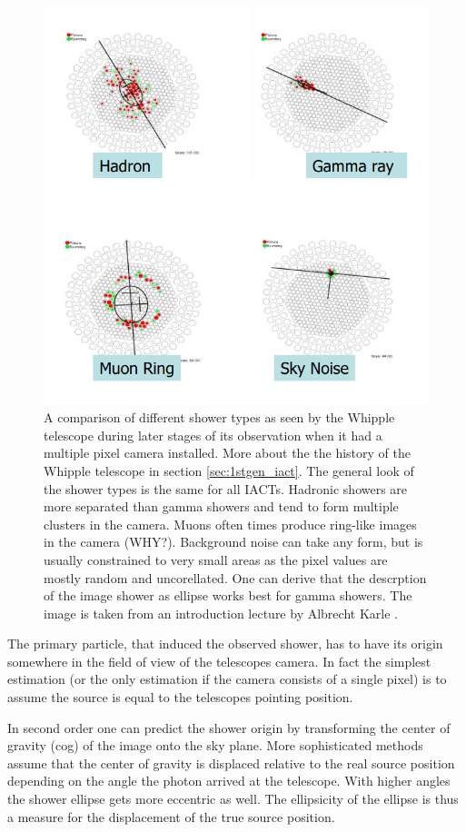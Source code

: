 \begin{figure}
	\centering
	\includegraphics[width=.8\textwidth]{images/shower_types.png}
	\caption{A comparison of different shower types as seen 
	by the Whipple telescope during later stages of its observation
	when it had a multiple pixel camera installed.
	More about the the history of the Whipple telescope in section
	\ref{sec:1stgen_iact}. The general look of the shower types 
	is the same for all IACTs.
	Hadronic showers are more separated than gamma showers and tend to
	form multiple clusters in the camera.
	Muons often times produce ring-like images in the camera (WHY?).
	Background noise can take any form, but is usually constrained to very small
	areas as the pixel values are mostly random and uncorellated.
	One can derive that the descrption of the image shower as ellipse
	works best for gamma showers.
	The image is taken from an introduction lecture by Albrecht Karle \cite{icecube_showers}.}
	\label{fig:compare_showers}
\end{figure}

The primary particle, that induced the observed shower, has to have its 
origin somewhere in the field of view of the telescopes camera.
In fact the simplest estimation (or the only estimation if the camera consists of a single pixel)
is to assume the source is equal to the telescopes pointing position.

In second order one can predict the shower origin by 
transforming the center of gravity (cog) of the image onto the sky plane.
More sophisticated methods assume that the 
center of gravity is displaced relative to the
real source position depending on the angle the photon arrived at the telescope.
With higher angles the shower ellipse gets more eccentric as well.
The ellipsicity of the ellipse is thus a measure for the displacement of the true 
source position.

